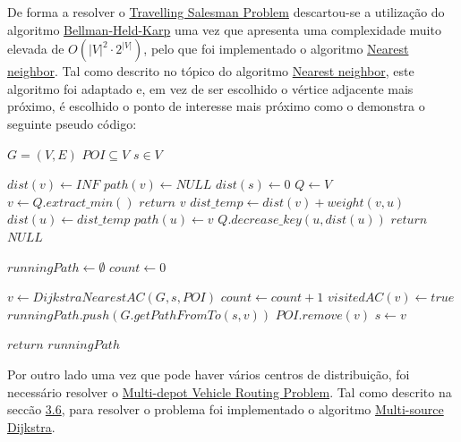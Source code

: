 \documentclass[12pt,a4paper]{report}
\begin{document}
De forma a resolver o \hyperref[perspetivas:tsp]{Travelling Salesman Problem} descartou-se a utilização do algoritmo \hyperref[algo:bellmanheldkarp]{Bellman-Held-Karp} uma vez que apresenta
uma complexidade muito elevada de \( O(|V|^2 \cdot 2^{|V|}) \), pelo que foi implementado o algoritmo \hyperref[algo:nn]{Nearest neighbor}.
Tal como descrito no tópico do algoritmo \hyperref[algo:nn]{Nearest neighbor}, este algoritmo foi adaptado e, em vez de ser escolhido o vértice adjacente
mais próximo, é escolhido o ponto de interesse mais próximo como o demonstra o seguinte pseudo código: \par

\begin{center}
	\begin{algorithmic}[1]
		\State $G = (V, E)$
		\State $POI \subseteq V$
		\State $s \in V$
		\newline

			\State $dist(v) \leftarrow INF$
			\State $path(v) \leftarrow NULL$
		\EndFor
		\State $dist(s) \leftarrow 0$
		\State $Q \leftarrow V$
			\State $v \leftarrow Q.extract\_min()$
				\State $return$ $v$
			\EndIf
				\State $dist\_temp \leftarrow dist(v) + weight(v,u)$
					\State $dist(u) \leftarrow dist\_temp$
					\State $path(u) \leftarrow v$
					\State $Q.decrease\_key(u,dist(u))$
				\EndIf
			\EndFor
		\EndWhile
		\State $return$ $NULL$
		\EndFunction
		\newline

		\State $runningPath \leftarrow \emptyset$
		\State $count \leftarrow 0$

			\State $v \leftarrow DijkstraNearestAC(G, s, POI)$
			\State $count \leftarrow count + 1$
			\State $visitedAC(v) \leftarrow true$
			\State $runningPath.push(G.getPathFromTo(s, v))$
			\State $POI.remove(v)$
			\State $s \leftarrow v$

		\EndWhile
		\State $return$ $runningPath$
		\EndFunction
	\end{algorithmic}
\end{center}


Por outro lado uma vez que pode haver vários centros de distribuição, foi necessário resolver o \hyperref[perpetivas:mdvrp]{Multi-depot Vehicle Routing Problem}. 
Tal como descrito na seccão \hyperref[perpetivas:mdvrp]{3.6}, para resolver o problema foi implementado o algoritmo \hyperref[algo:msdijkstra]{Multi-source Dijkstra}.
\end{document}
